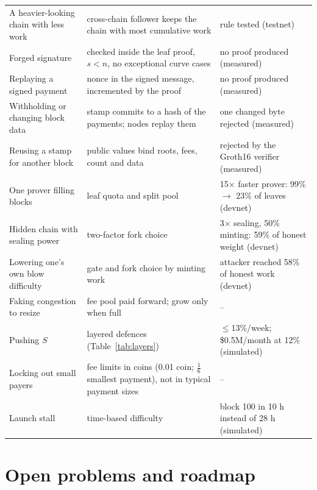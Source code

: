 \begin{center}
\begin{minipage}{\textwidth}
\begin{tabularx}{\textwidth}{l Y Y}
A heavier-looking chain with less work & cross-chain follower keeps the chain with most cumulative work & rule tested (testnet)\\
Forged signature & checked inside the leaf proof, $s<n$, no exceptional curve cases & no proof produced (measured)\\
Replaying a signed payment & nonce in the signed message, incremented by the proof & no proof produced (measured)\\
Withholding or changing block data & stamp commits to a hash of the payments; nodes replay them & one changed byte rejected (measured)\\
Reusing a stamp for another block & public values bind roots, fees, count and data & rejected by the Groth16 verifier (measured)\\
One prover filling blocks & leaf quota and split pool & 15$\times$ faster prover: 99\% $\to$ 23\% of leaves (devnet)\\
Hidden chain with sealing power & two-factor fork choice & 3$\times$ sealing, 50\% minting: 59\% of honest weight (devnet)\\
Lowering one's own blow difficulty & gate and fork choice by minting work & attacker reached 58\% of honest work (devnet)\\
Faking congestion to resize & fee pool paid forward; grow only when full & --\\
Pushing $S$ & layered defences (Table~\ref{tab:layers}) & $\le$13\%/week; \$0.5M/month at 12\% (simulated)\\
Locking out small payers & fee limits in coins (0.01 coin; $\tfrac16$~\JEN{} smallest payment), not in typical payment sizes & --\\
Launch stall & time-based difficulty & block 100 in 10 h instead of 28 h (simulated)\\
\bottomrule
\end{tabularx}
\end{minipage}\end{center}

\FloatBarrier
\section{Open problems and roadmap}\label{sec:open}

